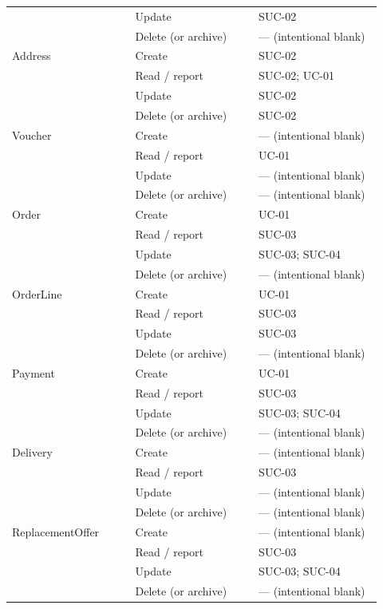 \begin{longtable}{>{\raggedright\arraybackslash}p{0.3067\linewidth}>{\raggedright\arraybackslash}p{0.3067\linewidth}>{\raggedright\arraybackslash}p{0.3067\linewidth}}
 & Update & SUC-02 \\
 & Delete (or archive) & --- (intentional blank) \\
Address & Create & SUC-02 \\
 & Read / report & SUC-02; UC-01 \\
 & Update & SUC-02 \\
 & Delete (or archive) & SUC-02 \\
Voucher & Create & --- (intentional blank) \\
 & Read / report & UC-01 \\
 & Update & --- (intentional blank) \\
 & Delete (or archive) & --- (intentional blank) \\
Order & Create & UC-01 \\
 & Read / report & SUC-03 \\
 & Update & SUC-03; SUC-04 \\
 & Delete (or archive) & --- (intentional blank) \\
OrderLine & Create & UC-01 \\
 & Read / report & SUC-03 \\
 & Update & SUC-03 \\
 & Delete (or archive) & --- (intentional blank) \\
Payment & Create & UC-01 \\
 & Read / report & SUC-03 \\
 & Update & SUC-03; SUC-04 \\
 & Delete (or archive) & --- (intentional blank) \\
Delivery & Create & --- (intentional blank) \\
 & Read / report & SUC-03 \\
 & Update & --- (intentional blank) \\
 & Delete (or archive) & --- (intentional blank) \\
ReplacementOffer & Create & --- (intentional blank) \\
 & Read / report & SUC-03 \\
 & Update & SUC-03; SUC-04 \\
 & Delete (or archive) & --- (intentional blank) \\
\end{longtable}
